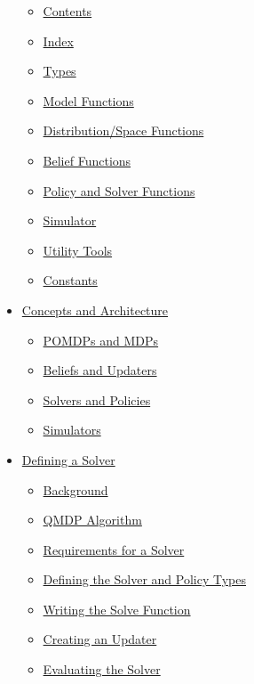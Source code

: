 \documentclass[12pt,]{article}
\providecommand{\tightlist}{%
  \setlength{\itemsep}{0pt}\setlength{\parskip}{0pt}}
\begin{document}
\begin{itemize}
  \begin{itemize}
  \tightlist
  \item
    \href{api.md\#Contents-1}{Contents}
  \item
    \href{api.md\#Index-1}{Index}
  \item
    \href{api.md\#Types-1}{Types}
  \item
    \href{api.md\#Model-Functions-1}{Model Functions}
  \item
    \href{api.md\#Distribution/Space-Functions-1}{Distribution/Space
    Functions}
  \item
    \href{api.md\#Belief-Functions-1}{Belief Functions}
  \item
    \href{api.md\#Policy-and-Solver-Functions-1}{Policy and Solver
    Functions}
  \item
    \href{api.md\#Simulator-1}{Simulator}
  \item
    \href{api.md\#Utility-Tools-1}{Utility Tools}
  \item
    \href{api.md\#Constants-1}{Constants}
  \end{itemize}
\item
  \href{concepts.md\#Concepts-and-Architecture-1}{Concepts and
  Architecture}

  \begin{itemize}
  \tightlist
  \item
    \href{concepts.md\#POMDPs-and-MDPs-1}{POMDPs and MDPs}
  \item
    \href{concepts.md\#Beliefs-and-Updaters-1}{Beliefs and Updaters}
  \item
    \href{concepts.md\#Solvers-and-Policies-1}{Solvers and Policies}
  \item
    \href{concepts.md\#Simulators-1}{Simulators}
  \end{itemize}
\item
  \href{def_solver.md\#Defining-a-Solver-1}{Defining a Solver}

  \begin{itemize}
  \tightlist
  \item
    \href{def_solver.md\#Background-1}{Background}
  \item
    \href{def_solver.md\#QMDP-Algorithm-1}{QMDP Algorithm}
  \item
    \href{def_solver.md\#Requirements-for-a-Solver-1}{Requirements for a
    Solver}
  \item
    \href{def_solver.md\#Defining-the-Solver-and-Policy-Types-1}{Defining
    the Solver and Policy Types}
  \item
    \href{def_solver.md\#Writing-the-Solve-Function-1}{Writing the Solve
    Function}
  \item
    \href{def_solver.md\#Creating-an-Updater-1}{Creating an Updater}
  \item
    \href{def_solver.md\#Evaluating-the-Solver-1}{Evaluating the Solver}
  \end{itemize}
\end{itemize}
\end{document}
